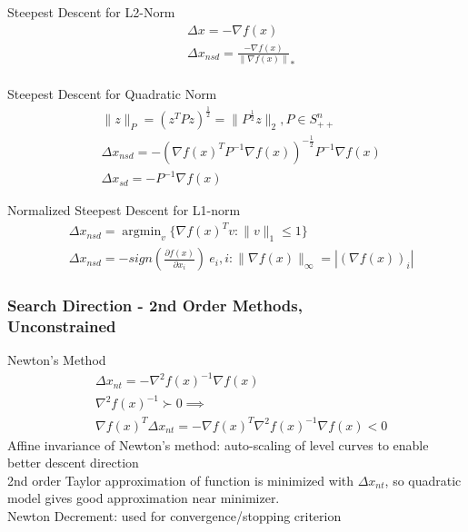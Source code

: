 \documentclass[8pt]{extarticle}
\DeclareMathOperator*{\argmin}{argmin}
\newcommand{\norm}[1]{\|#1\|}
\newcommand{\set}[1]{\{#1\}}
\begin{document}
\begin{multicols*}{2}
  Steepest Descent for L2-Norm
  \begin{align*}
    &\Delta x = -\nabla f(x)\\
    &\Delta x_{nsd} = \frac{-\nabla f(x)}{\norm{\nabla f(x)}}_*\\
  \end{align*}
  
  Steepest Descent for Quadratic Norm
  \begin{align*}
    &\norm{z}_P = (z^TPz)^{\frac{1}{2}} = \norm{P^{\frac{1}{2}}z}_2, P \in S_{++}^n\\
    &\Delta x_{nsd} = -(\nabla f(x)^T P^{-1} \nabla f(x))^{-\frac{1}{2}} P^{-1} \nabla f(x)\\
    &\Delta x_{sd} = -P^{-1} \nabla f(x)
  \end{align*}

  Normalized Steepest Descent for L1-norm
  \begin{align*}
    &\Delta x_{nsd} = \argmin_{v} \set{ \nabla f(x)^T v : \norm{v}_1 \leq 1 }\\
    &\Delta x_{nsd} = - sign (\frac{\partial f(x)}{\partial x_i})\ e_i, i: \norm{\nabla f(x)}_{\infty} = |(\nabla f(x))_i|
  \end{align*}
  \vfill\null  
  \pagebreak
  
  \subsubsection{Search Direction - 2nd Order Methods,\\ Unconstrained}
  Newton's Method
  \begin{align*}
    &\Delta x_{nt} = - \nabla^2 f(x)^{-1} \nabla f(x)\\
    &\nabla^2 f(x)^{-1} \succ 0 \implies\\
    &\nabla f(x)^T \Delta x_{nt} = - \nabla f(x)^T \nabla^2 f(x)^{-1} \nabla f(x) < 0
  \end{align*}
  Affine invariance of Newton's method: auto-scaling of level curves to enable better descent direction\\
  
  2nd order Taylor approximation of function is minimized with $\Delta x_{nt}$, so quadratic model gives good approximation near minimizer.\\

  Newton Decrement: used for convergence/stopping criterion
  

\end{multicols*}
\end{document}
